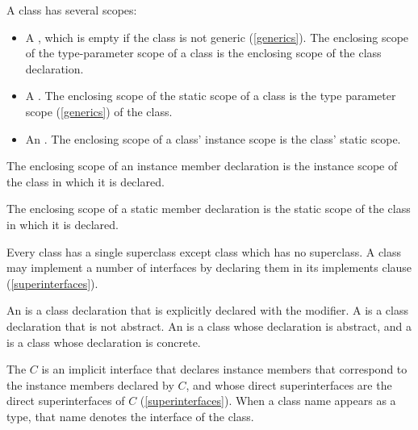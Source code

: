 \documentclass[makeidx]{article}
\begin{document}
\LMHash{}%
A class has several scopes:
\begin{itemize}
\item A ,
  which is empty if the class is not generic (\ref{generics}).
The enclosing scope of the type-parameter scope of a class is the enclosing scope of the class declaration.
\item A .
The enclosing scope of the static scope of a class is the type parameter scope (\ref{generics}) of the class.
\item An .
The enclosing scope of a class' instance scope is the class' static scope.
\end{itemize}

\LMHash{}%
The enclosing scope of an instance member declaration is the instance scope of the class in which it is declared.

\LMHash{}%
The enclosing scope of a static member declaration is the static scope of the class in which it is declared.

\LMHash{}%
Every class has a single superclass except class  which has no superclass.
A class may implement a number of interfaces by declaring them in its implements clause (\ref{superinterfaces}).

\LMHash{}%
An 
is a class declaration that is explicitly declared
with the \ABSTRACT{} modifier.
A 
is a class declaration that is not abstract.
An  is a class
whose declaration is abstract, and
a  is a class
whose declaration is concrete.


\LMHash{}%
The  $C$ is an implicit interface that declares instance members that correspond to the instance members declared by $C$, and whose direct superinterfaces are the direct superinterfaces of $C$ (\ref{superinterfaces}).
When a class name appears as a type, that name denotes the interface of the class.
\end{document}
